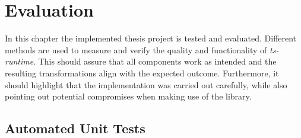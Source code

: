 \chapter{Evaluation}
\label{cha:evaluation}

In this chapter the implemented thesis project is tested and evaluated. Different methods are used to measure and verify the quality and functionality of \emph{ts-runtime}. This should assure that all components work as intended and the resulting transformations align with the expected outcome. Furthermore, it should highlight that the implementation was carried out carefully, while also pointing out potential compromises when making use of the library.

\section{Automated Unit Tests}
\label{sec:automated-unit-tests}


